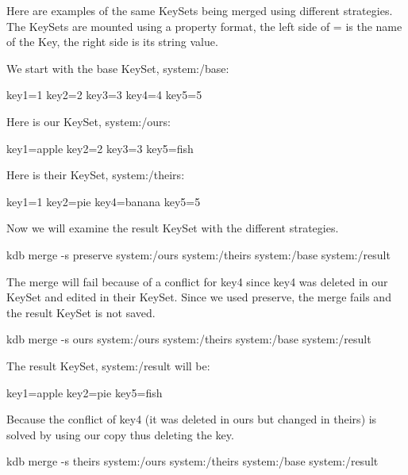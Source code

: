 Here are examples of the same Key\+Sets being merged using different strategies. The Key\+Sets are mounted using a property format, the left side of \textquotesingle{}=\textquotesingle{} is the name of the Key, the right side is its string value.

We start with the base Key\+Set, {\ttfamily system\+:/base}\+:


\begin{DoxyCode}
key1=1
key2=2
key3=3
key4=4
key5=5
\end{DoxyCode}


Here is our Key\+Set, {\ttfamily system\+:/ours}\+:


\begin{DoxyCode}
key1=apple
key2=2
key3=3
key5=fish
\end{DoxyCode}


Here is their Key\+Set, {\ttfamily system\+:/theirs}\+:


\begin{DoxyCode}
key1=1
key2=pie
key4=banana
key5=5
\end{DoxyCode}


Now we will examine the result Key\+Set with the different strategies.


\begin{DoxyCode}
kdb merge -s preserve system:/ours system:/theirs system:/base system:/result
\end{DoxyCode}


The merge will fail because of a conflict for {\ttfamily key4} since {\ttfamily key4} was deleted in our Key\+Set and edited in their Key\+Set. Since we used preserve, the merge fails and the result Key\+Set is not saved.


\begin{DoxyCode}
kdb merge -s ours system:/ours system:/theirs system:/base system:/result
\end{DoxyCode}


The result Key\+Set, system\+:/result will be\+:


\begin{DoxyCode}
key1=apple
key2=pie
key5=fish
\end{DoxyCode}


Because the conflict of {\ttfamily key4} (it was deleted in {\ttfamily ours} but changed in {\ttfamily theirs}) is solved by using our copy thus deleting the key.


\begin{DoxyCode}
kdb merge -s theirs system:/ours system:/theirs system:/base system:/result
\end{DoxyCode}


